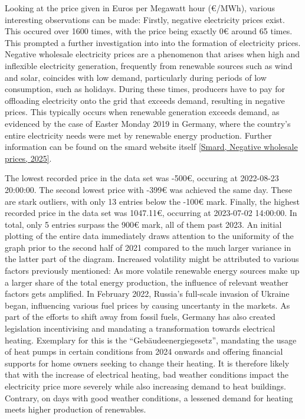\documentclass[a4paper]{article}
\begin{document}
Looking at the price given in Euros per Megawatt hour (\euro{}/MWh), various
interesting observations can be made: Firstly, negative electricity
prices exist. This occured over 1600 times, with the price being exactly
0\euro{} around 65 times. This prompted a further investigation into into the
formation of electricity prices. Negative wholesale electricity prices
are a phenomenon that arises when high and inflexible electricity
generation, frequently from renewable sources such as wind and solar,
coincides with low demand, particularly during periods of low
consumption, such as holidays. During these times, producers have to pay
for offloading electricity onto the grid that exceeds demand, resulting
in negative prices. This typically occurs when renewable generation
exceeds demand, as evidenced by the case of Easter Monday 2019 in
Germany, where the country's entire electricity needs were met by
renewable energy production. Further information can be found on the
smard website itself \hyperref[bibliography]{[Smard, Negative wholesale prices, 2025]}.

The lowest recorded price in the data set was -500\euro{}, occuring at
2022-08-23 20:00:00. The second lowest price with -399\euro{} was achieved the
same day. These are stark outliers, with only 13 entries below the -100\euro{}
mark. Finally, the highest recorded price in the data set was 1047.11\euro{},
occurring at 2023-07-02 14:00:00. In total, only 5 entries surpass the
900\euro{} mark, all of them past 2023. An initial plotting of the entire data
immediately draws attention to the uniformity of the graph prior to the
second half of 2021 compared to the much larger variance in the latter
part of the diagram. Increased volatility might be attributed to various
factors previously mentioned: As more volatile renewable energy sources
make up a larger share of the total energy production, the influence of
relevant weather factors gets amplified. In February 2022, Russia's
full-scale invasion of Ukraine began, influencing various fuel prices by
causing uncertanty in the markets. As part of the efforts to shift away
from fossil fuels, Germany has also created legislation incentivising
and mandating a transformation towards electrical heating. Exemplary for
this is the ``Gebäudeenergiegesetz'', mandating the usage of heat pumps
in certain conditions from 2024 onwards and offering financial supports
for home owners seeking to change their heating. It is therefore likely
that with the increase of electrical heating, bad weather conditions
impact the electricity price more severely while also increasing demand
to heat buildings. Contrary, on days with good weather conditions, a
lessened demand for heating meets higher production of renewables.
\end{document}
